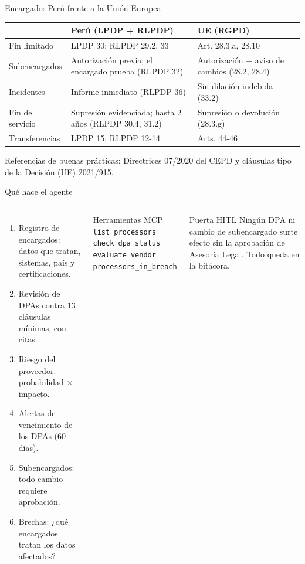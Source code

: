 \documentclass[aspectratio=169,10pt]{beamer}
\begin{document}
\begin{frame}{Encargado: Perú frente a la Unión Europea}
\small
\begin{tabular}{@{}p{}p{}p{}@{}}
\toprule
 & \textbf{Perú (LPDP + RLPDP)} & \textbf{UE (RGPD)} \\
\midrule
Fin limitado & LPDP 30; RLPDP 29.2, 33 & Art. 28.3.a, 28.10 \\
Subencargados & Autorización previa; el encargado prueba (RLPDP 32) & Autorización + aviso de cambios (28.2, 28.4) \\
Incidentes & Informe \alert{inmediato} (RLPDP 36) & Sin dilación indebida (33.2) \\
Fin del servicio & Supresión \alert{evidenciada}; hasta 2 años (RLPDP 30.4, 31.2) & Supresión o devolución (28.3.g) \\
Transferencias & LPDP 15; RLPDP 12-14 & Arts. 44-46 \\
\bottomrule
\end{tabular}
\vspace{4pt}

\footnotesize Referencias de buenas prácticas: Directrices 07/2020 del CEPD y cláusulas tipo de la Decisión (UE) 2021/915.
\end{frame}

\begin{frame}{Qué hace el agente}
\begin{columns}[T]
\begin{enumerate}
  \item \alert{Registro} de encargados: datos que tratan, sistemas, país y certificaciones.
  \item \alert{Revisión de DPAs} contra 13 cláusulas mínimas, con citas.
  \item \alert{Riesgo} del proveedor: probabilidad × impacto.
  \item \alert{Alertas} de vencimiento de los DPAs (60 días).
  \item \alert{Subencargados}: todo cambio requiere aprobación.
  \item \alert{Brechas}: ¿qué encargados tratan los datos afectados?
\end{enumerate}
\begin{block}{Herramientas MCP}
\texttt{list\_processors}\\
\texttt{check\_dpa\_status}\\
\texttt{evaluate\_vendor}\\
\texttt{processors\_in\_breach}
\end{block}
\begin{alertblock}{Puerta HITL}
Ningún DPA ni cambio de subencargado surte efecto sin la aprobación de Asesoría Legal. Todo queda en la bitácora.
\end{alertblock}
\end{columns}
\end{frame}
\end{document}
